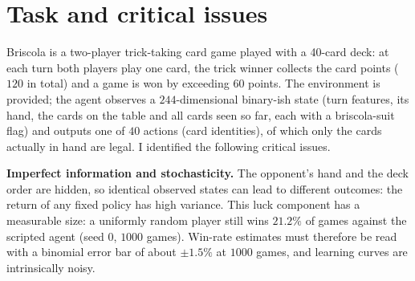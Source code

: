 \documentclass{article}
\begin{document}

\printAffiliationsAndNotice{}

\begin{abstract}
I train an agent for two-player Briscola with the goal of maximizing the win rate against the provided rule-based \texttt{ScriptedAIAgent}.
I first design a non-learning heuristic baseline built on card counting and expected-value reasoning, which wins $59.9\%$ of the games against the scripted opponent.
I then train a Deep Q-Network with action masking on the legal moves, filling the gaps in the provided codebase.
The learned agent reliably beats the scripted opponent ($52.3\%$ win rate over $1000$ evaluation games) but does not surpass my baseline.
As a bonus, I train the full $2 \times 2$ matrix \{DQN, A2C\} $\times$ \{standard, ``own points''\} reward: the algorithm choice dominates, with both A2C runs remaining near the luck floor while DQN is robust to the reward variant.
I analyze why, and discuss the improvements I consider most promising.
\end{abstract}

\section{Task and critical issues}
\label{sec:task}

Briscola is a two-player trick-taking card game played with a 40-card deck: at each turn both players play one card, the trick winner collects the card points ($120$ in total) and a game is won by exceeding $60$ points. The environment is provided; the agent observes a $244$-dimensional binary-ish state (turn features, its hand, the cards on the table and all cards seen so far, each with a briscola-suit flag) and outputs one of $40$ actions (card identities), of which only the cards actually in hand are legal. I identified the following critical issues.

\textbf{Imperfect information and stochasticity.} The opponent's hand and the deck order are hidden, so identical observed states can lead to different outcomes: the return of any fixed policy has high variance. This luck component has a measurable size: a uniformly random player still wins $21.2\%$ of games against the scripted agent (seed 0, $1000$ games). Win-rate estimates must therefore be read with a binomial error bar of about $\pm 1.5\%$ at $1000$ games, and learning curves are intrinsically noisy.
\end{document}
